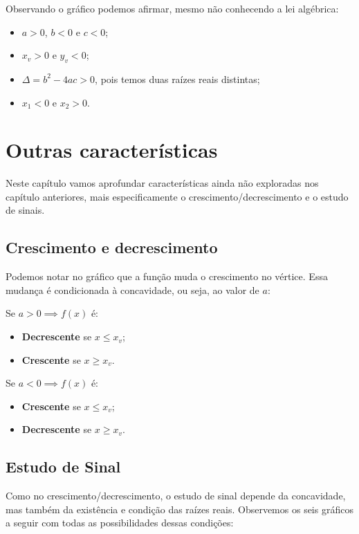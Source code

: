 \documentclass[12pt,a4paper]{report}
\begin{document}
	Observando o gráfico podemos afirmar, mesmo não conhecendo a lei algébrica:
	\begin{itemize}
		\item $a>0$, $b<0$ e $c<0$;
		\item $x_v > 0$ e $y_v <0$;
		\item $\Delta = b^2-4ac > 0$, pois temos duas raízes reais distintas;
		\item $x_1<0$ e $x_2>0$.
		
		
	\end{itemize}
	
	\chapter{Outras características}
	
	Neste capítulo vamos aprofundar características ainda não exploradas nos capítulo anteriores, mais especificamente o crescimento/decrescimento e o estudo de sinais.
	
	\section{Crescimento e decrescimento}
	
	Podemos notar no gráfico que a função muda o crescimento no vértice. Essa mudança é condicionada à concavidade, ou seja, ao valor de $a$:
	
	\begin{destaque}
		Se $a>0 \implies f(x)$ é:
		\begin{itemize}
			\item \textbf{Decrescente} se $x\leqslant x_v$;
			\item \textbf{Crescente} se $x\geqslant x_v$.
		\end{itemize}
		Se $a<0 \implies f(x)$ é:
		\begin{itemize}
			\item \textbf{Crescente} se $x\leqslant x_v$;
			\item \textbf{Decrescente} se $x\geqslant x_v$.
		\end{itemize}
	\end{destaque}
	
	\section{Estudo de Sinal}
	Como no crescimento/decrescimento, o estudo de sinal depende da concavidade, mas também da existência e condição das raízes reais. Observemos os seis gráficos a seguir com todas as possibilidades dessas condições:
	
\end{document}

